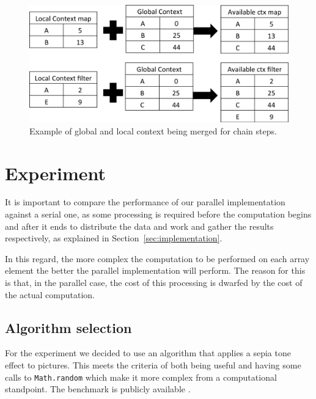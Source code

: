 \documentclass[runningheads,a4paper]{llncs}
\begin{document}
\begin{figure}
\centering
\includegraphics[width=1\textwidth]{context}
\caption{Example of global and local context being merged for chain steps.}
\label{fig:context}
\end{figure}

\section{Experiment}\label{sec:experiment}
It is important to compare the performance of our parallel implementation against a serial one, as some processing is required before the computation begins and after it ends to distribute the data and work and gather the results respectively, as explained in Section~\ref{sec:implementation}.

In this regard, the more complex the computation to be performed on each array element the better the parallel implementation will perform. The reason for this is that, in the parallel case, the cost of this processing is dwarfed by the cost of the actual computation.

\subsection{Algorithm selection}
For the experiment we decided to use an algorithm that applies a sepia tone effect to pictures. This meets the criteria of both being useful and having some calls to \verb+Math.random+ which make it more complex from a computational standpoint. The benchmark is publicly available \cite{benchmark}.
\end{document}

